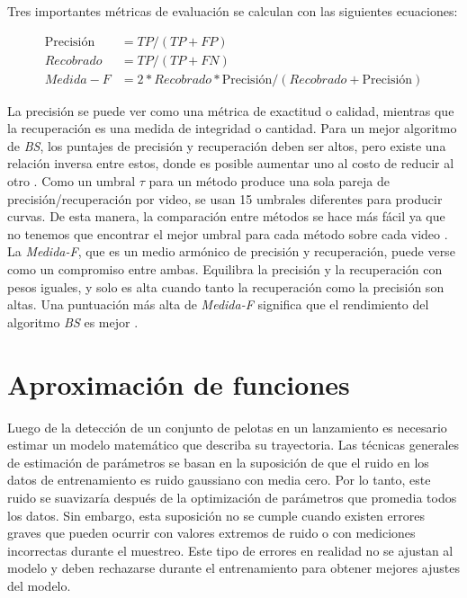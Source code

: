 Tres importantes métricas de evaluación se calculan con las siguientes ecuaciones:

\begin{equation*}
    \begin{split}
        \text{Precisión} & = TP/(TP + FP)\\
        Recobrado & = TP/(TP + FN)\\
        Medida-F & =  2 * Recobrado * \text{Precisión}/(Recobrado + \text{Precisión})
    \end{split}
\end{equation*}

La precisión se puede ver como una métrica de exactitud o calidad, mientras que la recuperación es una medida de integridad o cantidad. Para un mejor algoritmo de \textit{BS}, los puntajes de precisión y recuperación deben ser altos, pero existe una relación inversa entre estos, donde es posible aumentar uno al costo de reducir al otro \cite{GuangleTaoJiandanPingWenwu}. Como un umbral $\tau$ para un método produce una sola pareja de precisión/recuperación por video, se usan 15 umbrales diferentes para producir curvas. De esta manera, la comparación entre métodos se hace más fácil ya que no tenemos que encontrar el mejor umbral para cada método sobre cada video \cite{YannickPierreMarcBrunoHeleneChristophe}. La \textit{Medida-F}, que es un medio armónico de precisión y recuperación, puede verse como un compromiso entre ambas. Equilibra la precisión y la recuperación con pesos iguales, y solo es alta cuando tanto la recuperación como la precisión son altas. Una puntuación más alta de \textit{Medida-F} significa que el rendimiento del algoritmo \textit{BS} es mejor \cite{GuangleTaoJiandanPingWenwu}.

\section{Aproximación de funciones}

Luego de la detección de un conjunto de pelotas en un lanzamiento es necesario estimar un modelo matemático que describa su trayectoria. Las técnicas generales de estimación de parámetros se basan en la suposición de que el ruido en los datos de entrenamiento es ruido gaussiano con media cero. Por lo tanto, este ruido se suavizaría después de la optimización de parámetros que promedia todos los datos. Sin embargo, esta suposición no se cumple cuando existen errores graves que pueden ocurrir con valores extremos de ruido o con mediciones incorrectas durante el muestreo. Este tipo de errores en realidad no se ajustan al modelo y deben rechazarse durante el entrenamiento para obtener mejores ajustes del modelo.

